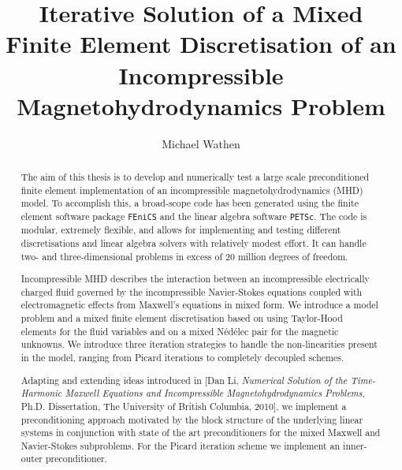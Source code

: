 \documentclass[msc,oneside]{ubcthesis}
\title{Iterative Solution of a Mixed Finite Element Discretisation of
an Incompressible Magnetohydrodynamics Problem}
\author{Michael Wathen}
\numberwithin{equation}{chapter}    %
\newcommand{\fenics}{{\tt FEniCS} }
\newcommand{\nedelec}{N\'{e}d\'{e}lec }
\begin{document}
\lstset{language=Python}





\frontmatter


\maketitle                      %
\begin{abstract}                %
The aim of this thesis is to develop and numerically test a large scale preconditioned finite element implementation of an incompressible magnetohydrodynamics (MHD) model. To accomplish this, a broad-scope code has been generated using the finite element software package \fenics and the linear algebra software {\tt PETSc}. The code is modular, extremely flexible, and allows for implementing and testing different discretisations and linear algebra solvers with relatively modest effort. It can handle two- and three-dimensional problems in excess of 20 million degrees of freedom.

Incompressible MHD describes the interaction between an incompressible electrically charged fluid governed by the incompressible Navier-Stokes equations coupled with electromagnetic effects from  Maxwell's equations in mixed form. We introduce a model problem and a mixed finite element discretisation based on using Taylor-Hood elements for the fluid variables and on a mixed \nedelec pair for the magnetic unknowns. We introduce three iteration strategies to handle the non-linearities present in the model, ranging from Picard iterations to completely decoupled schemes.


Adapting and extending ideas introduced in [Dan Li, {\em Numerical Solution of the Time-Harmonic Maxwell Equations and Incompressible Magnetohydrodynamics Problems}, Ph.D. Dissertation, The University of British Columbia, 2010], we implement a preconditioning approach motivated by the block structure of the underlying linear systems in conjunction with state of the art preconditioners for the mixed Maxwell and Navier-Stokes subproblems. For the Picard iteration scheme we implement an inner-outer preconditioner.


\end{abstract}
\end{document}
